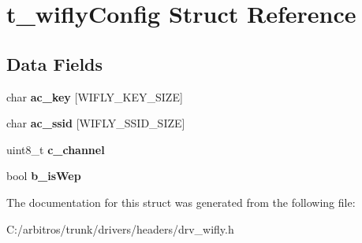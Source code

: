 \hypertarget{structt__wifly_config}{\section{t\-\_\-wifly\-Config Struct Reference}
\label{structt__wifly_config}
}
\subsection*{Data Fields}
\begin{DoxyCompactItemize}
\item 
\hypertarget{structt__wifly_config_a99a01c112e4655a6273a63444dc2e731}{char {\bfseries ac\-\_\-key} \mbox{[}W\-I\-F\-L\-Y\-\_\-\-K\-E\-Y\-\_\-\-S\-I\-Z\-E\mbox{]}}\label{structt__wifly_config_a99a01c112e4655a6273a63444dc2e731}

\item 
\hypertarget{structt__wifly_config_acb91dc4c1290bb05d3b2379dda707e19}{char {\bfseries ac\-\_\-ssid} \mbox{[}W\-I\-F\-L\-Y\-\_\-\-S\-S\-I\-D\-\_\-\-S\-I\-Z\-E\mbox{]}}\label{structt__wifly_config_acb91dc4c1290bb05d3b2379dda707e19}

\item 
\hypertarget{structt__wifly_config_a451307e1b975001a3b6361a533860abf}{uint8\-\_\-t {\bfseries c\-\_\-channel}}\label{structt__wifly_config_a451307e1b975001a3b6361a533860abf}

\item 
\hypertarget{structt__wifly_config_a7e202ed7c9ded18b7a107a74d3a6e0dd}{bool {\bfseries b\-\_\-is\-Wep}}\label{structt__wifly_config_a7e202ed7c9ded18b7a107a74d3a6e0dd}

\end{DoxyCompactItemize}


The documentation for this struct was generated from the following file\-:\begin{DoxyCompactItemize}
\item 
C\-:/arbitros/trunk/drivers/headers/drv\-\_\-wifly.\-h\end{DoxyCompactItemize}
